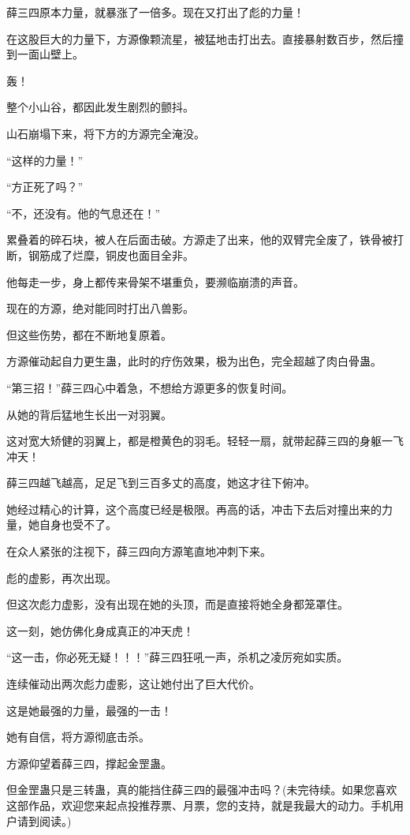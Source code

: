\begin{this_body}
薛三四原本力量，就暴涨了一倍多。现在又打出了彪的力量！

在这股巨大的力量下，方源像颗流星，被猛地击打出去。直接暴射数百步，然后撞到一面山壁上。

轰！

整个小山谷，都因此发生剧烈的颤抖。

山石崩塌下来，将下方的方源完全淹没。

“这样的力量！”

“方正死了吗？”

“不，还没有。他的气息还在！”

累叠着的碎石块，被人在后面击破。方源走了出来，他的双臂完全废了，铁骨被打断，钢筋成了烂糜，铜皮也面目全非。

他每走一步，身上都传来骨架不堪重负，要濒临崩溃的声音。

现在的方源，绝对能同时打出八兽影。

但这些伤势，都在不断地复原着。

方源催动起自力更生蛊，此时的疗伤效果，极为出色，完全超越了肉白骨蛊。

“第三招！”薛三四心中着急，不想给方源更多的恢复时间。

从她的背后猛地生长出一对羽翼。

这对宽大矫健的羽翼上，都是橙黄色的羽毛。轻轻一扇，就带起薛三四的身躯一飞冲天！

薛三四越飞越高，足足飞到三百多丈的高度，她这才往下俯冲。

她经过精心的计算，这个高度已经是极限。再高的话，冲击下去后对撞出来的力量，她自身也受不了。

在众人紧张的注视下，薛三四向方源笔直地冲刺下来。

彪的虚影，再次出现。

但这次彪力虚影，没有出现在她的头顶，而是直接将她全身都笼罩住。

这一刻，她仿佛化身成真正的冲天虎！

“这一击，你必死无疑！！！”薛三四狂吼一声，杀机之凌厉宛如实质。

连续催动出两次彪力虚影，这让她付出了巨大代价。

这是她最强的力量，最强的一击！

她有自信，将方源彻底击杀。

方源仰望着薛三四，撑起金罡蛊。

但金罡蛊只是三转蛊，真的能挡住薛三四的最强冲击吗？(未完待续。如果您喜欢这部作品，欢迎您来起点投推荐票、月票，您的支持，就是我最大的动力。手机用户请到阅读。)

\end{this_body}

